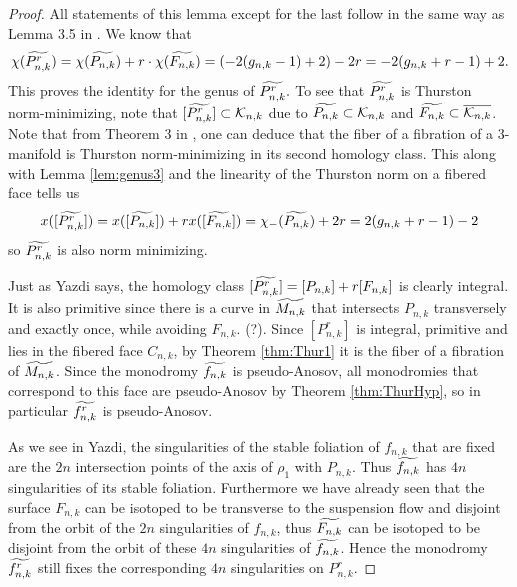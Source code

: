 \begin{proof}
    All statements of this lemma except for the last follow in the same way as Lemma 3.5 in \cite{yazdi2018pseudo}. We know that
    $$\chi(\widetilde{P^r_{n,k}}) = \chi(\widetilde{P_{n,k}}) + r\cdot\chi(\widetilde{F_{n,k}}) = (-2(g_{n,k} - 1) + 2)-2r = -2(g_{n,k} + r - 1) + 2.$$ This proves the identity for the genus of $\widetilde{P^r_{n,k}}.$ To see that $\widetilde{P^r_{n,k}}$ is Thurston norm-minimizing, note that $[\widetilde{P^r_{n,k}}] \subset \mathcal{K}_{n,k}$ due to $\widetilde{P_{n,k}} \subset \mathcal{K}_{n,k}$ and $\widetilde{F_{n,k}} \subset \overline{\mathcal{K}_{n,k}}$. Note that from Theorem 3 in \cite{thurston1986norm}, one can deduce that the fiber of a fibration of a 3-manifold is Thurston norm-minimizing in its second homology class. This along with Lemma \ref{lem:genus3} and the linearity of the Thurston norm on a fibered face tells us
    \begin{align*}
        x([\widetilde{P^r_{n,k}}]) = x([\widetilde{P_{n,k}}]) + rx([\widetilde{F_{n,k}}]) = \chi_-(\widetilde{P_{n,k}}) + 2r = 2(g_{n,k} + r - 1) - 2
    \end{align*}
    so $\widetilde{P^r_{n,k}}$ is also norm minimizing.

    Just as Yazdi says, the homology class $[\widetilde{P^r_{n,k}}] = [P_{n,k}] + r[F_{n,k}]$ is clearly integral. It is also primitive since there is a curve in $\widetilde{M_{n,k}}$ that intersects $P_{n,k}$ transversely and exactly once, while avoiding $F_{n,k}$. (?). Since $[P^r_{n,k}]$ is integral, primitive and lies in the fibered face $C_{n,k}$, by Theorem \ref{thm:Thur1} it is the fiber of a fibration of $\widetilde{M_{n,k}}$. Since the monodromy $\widetilde{f_{n,k}}$ is pseudo-Anosov, all monodromies that correspond to this face are pseudo-Anosov by Theorem \ref{thm:ThurHyp}, so in particular $\widetilde{f^r_{n,k}}$ is pseudo-Anosov.

    As we see in Yazdi, the singularities of the stable foliation of $f_{n,k}$ that are fixed are the $2n$ intersection points of the axis of $\rho_1$ with $P_{n,k}$. Thus $\widetilde{f_{n,k}}$ has $4n$ singularities of its stable foliation. Furthermore we have already seen that the surface $F_{n,k}$ can be isotoped to be transverse to the suspension flow and disjoint from the orbit of the $2n$ singularities of $f_{n,k}$, thus $\widetilde{F_{n,k}}$ can be isotoped to be disjoint from the orbit of these $4n$ singularities of $\widetilde{f_{n,k}}$. Hence the monodromy $\widetilde{f^r_{n,k}}$ still fixes the corresponding $4n$ singularities on $P^r_{n,k}$.


\end{proof}
